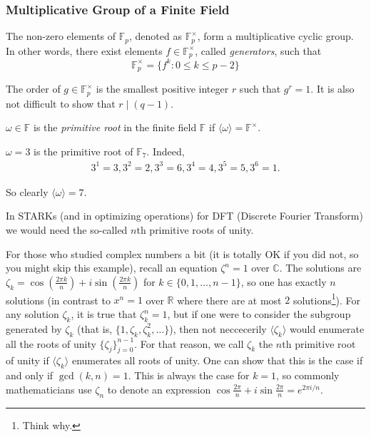 \documentclass[../lecture-notes.tex]{subfiles}
\begin{document}
\subsubsection{Multiplicative Group of a Finite Field}

The non-zero elements of $\mathbb{F}_p$, denoted as $\mathbb{F}_p^{\times}$, form a multiplicative cyclic group. In other words, there exist elements $f \in \mathbb{F}_p^{\times}$, called \textit{generators}, such that
\begin{equation}
    \mathbb{F}_p^{\times} = \{f^k: 0 \leq k \leq p-2\}
\end{equation}

The order of $g \in \mathbb{F}_p^{\times}$ is the smallest positive integer $r$ such that $g^r=1$. It is also not difficult to show that $r \mid (q-1)$.

\begin{definition}
    $\omega \in \mathbb{F}$ is the \textit{primitive root} in the finite field $\mathbb{F}$ if $\langle\omega\rangle = \mathbb{F}^{\times}$.
\end{definition}

\begin{example}
    $\omega=3$ is the primitive root of $\mathbb{F}_7$. Indeed,
    \begin{equation}
        \begin{aligned}
            3^1=3, 3^2=2, 3^3=6, 3^4=4, 3^5=5, 3^6=1.
        \end{aligned}
    \end{equation}

    So clearly $\langle \omega \rangle = 7$.
\end{example}

In STARKs (and in optimizing operations) for DFT (Discrete Fourier Transform) we would need the so-called $n$th primitive roots of unity.

\begin{example}
    For those who studied complex numbers a bit (it is totally OK if you did not, so you might skip this example), recall an equation $\zeta^n=1$ over $\mathbb{C}$. The solutions are $\zeta_k = \cos\left(\frac{2\pi k}{n}\right) + i\sin\left(\frac{2\pi k}{n}\right)$ for $k\in\{0,1,\dots,n-1\}$, so one has exactly $n$ solutions (in contrast to $x^n=1$ over $\mathbb{R}$ where there are at most $2$ solutions\footnote{Think why.}). For any solution $\zeta_k$, it is true that $\zeta_k^n=1$, but if one were to consider the subgroup generated by $\zeta_k$ (that is, $\{1,\zeta_k, \zeta_k^2,\dots\}$), then not neccecerily $\langle \zeta_k \rangle$ would enumerate all the roots of unity $\{\zeta_j\}_{j=0}^{n-1}$. For that reason, we call $\zeta_k$ the $n$th primitive root of unity if $\langle \zeta_k \rangle$ enumerates all roots of unity. One can show that this is the case if and only if $\gcd(k,n)=1$. This is always the case for $k=1$, so commonly mathematicians use $\zeta_n$ to denote an expression $\cos \frac{2\pi}{n} + i\sin\frac{2\pi}{n} = e^{2\pi i/n}$.
\end{example}
\end{document}
